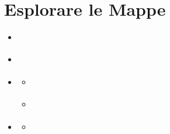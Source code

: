 \documentclass[letterpaper,10pt,english]{sphinxmanual}
\begin{document}
\sphinxstepscope


\section{Esplorare le Mappe}
\label{\detokenize{it/04_esplorare_mappe:esplorare-le-mappe}}\label{\detokenize{it/04_esplorare_mappe:maps-it}}\label{\detokenize{it/04_esplorare_mappe::doc}}
\begin{sphinxcontents}
\begin{itemize}
\item {} 
\sphinxAtStartPar
{}\label{\detokenize{it/04_esplorare_mappe:id1}}{\hyperref[\detokenize{it/04_esplorare_mappe:trovare-una-mappa}]{}}

\item {} 
\sphinxAtStartPar
{}\label{\detokenize{it/04_esplorare_mappe:id2}}{\hyperref[\detokenize{it/04_esplorare_mappe:l-interfaccia-del-visualizzatore-mappa}]{}}

\item {} 
\sphinxAtStartPar
{}\label{\detokenize{it/04_esplorare_mappe:id3}}{\hyperref[\detokenize{it/04_esplorare_mappe:navigare-la-mappa}]{}}
\begin{itemize}
\item {} 
\sphinxAtStartPar
{}\label{\detokenize{it/04_esplorare_mappe:id4}}{\hyperref[\detokenize{it/04_esplorare_mappe:navigazione-di-base}]{}}

\item {} 
\sphinxAtStartPar
{}\label{\detokenize{it/04_esplorare_mappe:id5}}{\hyperref[\detokenize{it/04_esplorare_mappe:andare-a-una-posizione-specifica}]{}}

\end{itemize}

\item {} 
\sphinxAtStartPar
{}\label{\detokenize{it/04_esplorare_mappe:id6}}{\hyperref[\detokenize{it/04_esplorare_mappe:lavorare-con-i-layer}]{}}
\begin{itemize}
\item {} 
\sphinxAtStartPar
{}\label{\detokenize{it/04_esplorare_mappe:id7}}{\hyperref[\detokenize{it/04_esplorare_mappe:aprire-il-pannello-layer}]{}}


\end{itemize}
\end{itemize}
\end{sphinxcontents}
\end{document}
